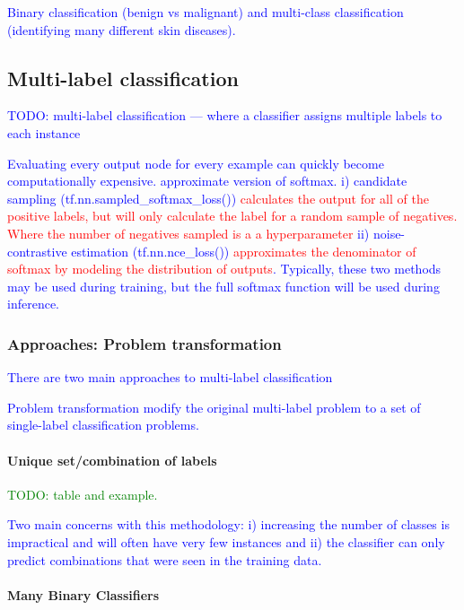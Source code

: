 \textcolor{blue}{Binary classification (benign vs malignant) and multi-class classification (identifying many different skin diseases).}

\subsection{Multi-label classification}
\textcolor{blue}{TODO: {multi-label classification} --- where a classifier assigns multiple labels to each instance}

\textcolor{blue}{Evaluating every output node for every example can quickly become computationally expensive. approximate version of softmax. i) candidate sampling (tf.nn.sampled\_softmax\_loss()) \textcolor{red}{calculates the output for all of the positive labels, but will only calculate the label for a random sample of negatives. Where the number of negatives sampled is a a hyperparameter} ii) noise-contrastive estimation (tf.nn.nce\_loss()) \textcolor{red}{approximates the denominator of softmax by modeling the distribution of outputs}. Typically, these two methods may be used during training, but the full softmax function will be used during inference.}


\subsubsection{Approaches: Problem transformation}

\textcolor{blue}{There are two main approaches to multi-label classification}

\textcolor{blue}{{Problem transformation} modify the original multi-label problem to a set of single-label classification problems.}

\paragraph{Unique set/combination of labels}

\textcolor{green}{TODO: table and example.}

\textcolor{blue}{Two main concerns with this methodology: i) increasing the number of classes is impractical and will often have very few instances and ii) the classifier can only predict combinations that were seen in the training data.}

\paragraph{Many Binary Classifiers}

